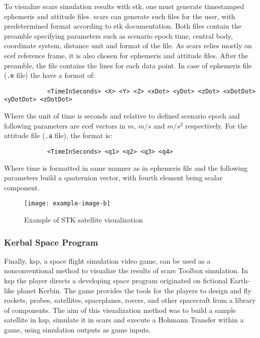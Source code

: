         To visualize \ac{scars} simulation results with \ac{stk}, one must generate timestamped ephemeris and attitude files. \ac{scars} can generate such files for the user, with predetermined format according to \ac{stk} documentation\cite{stkephemeris}. Both files contain the preamble specifying parameters such as scenario epoch time, central body, coordinate system, distance unit and format of the file. As \ac{scars} relies mostly on \ac{ecef} reference frame, it is also chosen for ephemeris and attitude files. After the preamble, the file contains the lines for each data point. In case of ephemeris file  (\verb|.e| file) the have a format of:
        \begin{verbatim}
            <TimeInSeconds> <X> <Y> <Z> <xDot> <yDot> <zDot> <xDotDot> <yDotDot> <zDotDot>
        \end{verbatim}
        Where the unit of time is seconds and relative to defined scenario epoch and following parameters are \ac{ecef} vectors in $m$, $m/s$ and $m/s^2$ respectively. For the attitude file (\verb|.a| file), the format is:
        \begin{verbatim}
            <TimeInSeconds> <q1> <q2> <q3> <q4>
        \end{verbatim}
        Where time is formatted in same manner as in ephemeris file and the following parameters build a quaternion vector, with fourth element being scalar component.


        \begin{figure}[H]
            \centering
            \texttt{[image: example-image-b]}
            \caption{Example of STK satellite visualization}
            \label{fig:stk}
        \end{figure}


    \subsubsection{Kerbal Space Program}\label{sec:ksp}
        Finally, \ac{ksp}, a space flight simulation video game, can be used as a nonconventional method to visualize the results of \ac{scars} Toolbox simulation. In \ac{ksp} the player directs a developing space program originated on fictional Earth-like planet Kerbin. The game provides the tools for the players to design and fly rockets, probes, satellites, spaceplanes, rovers, and other spacecraft from a library of components.\cite{kerbals} The aim of this visualization method was to build a sample satellite in \ac{ksp}, simulate it in \ac{scars} and execute a Hohmann Transfer within a game, using simulation outputs as game inputs.

